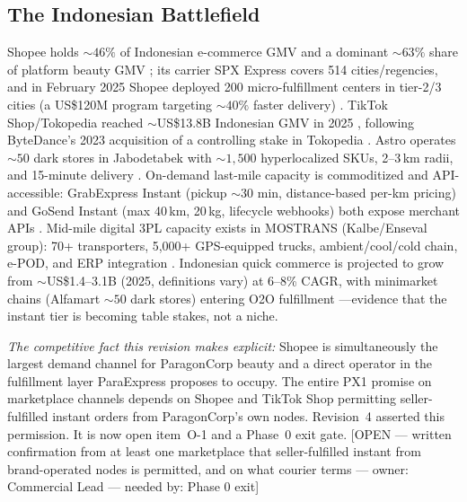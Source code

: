 \documentclass[10pt,twocolumn,letterpaper]{article}
\theoremstyle{definition}
\newcommand{\OPEN}[3]{{\color{openred}\footnotesize\textsf{[OPEN --- #1 --- owner: #2 --- needed by: #3]}}}
\begin{document}
\subsection{The Indonesian Battlefield}
Shopee holds ${\sim}46\%$ of Indonesian e-commerce GMV and a dominant ${\sim}63\%$ share of platform beauty GMV \cite{magpieiq2026,databoks2024}; its carrier SPX Express covers 514 cities/regencies, and in February 2025 Shopee deployed 200 micro-fulfillment centers in tier-2/3 cities (a US\$120M program targeting ${\sim}40\%$ faster delivery) \cite{spx2025,mordor2024}. TikTok Shop/Tokopedia reached ${\sim}$US\$13.8B Indonesian GMV in 2025 \cite{moca2026}, following ByteDance's 2023 acquisition of a controlling stake in Tokopedia \cite{nikkei2023}. Astro operates ${\sim}50$ dark stores in Jabodetabek with ${\sim}1{,}500$ hyperlocalized SKUs, 2--3\,km radii, and 15-minute delivery \cite{theken2023,gpca2024}. On-demand last-mile capacity is commoditized and API-accessible: GrabExpress Instant (pickup ${\sim}30$ min, distance-based per-km pricing) and GoSend Instant (max 40\,km, 20\,kg, lifecycle webhooks) both expose merchant APIs \cite{grab2025,gojek2024}. Mid-mile digital 3PL capacity exists in MOSTRANS (Kalbe/Enseval group): 70+ transporters, 5,000+ GPS-equipped trucks, ambient/cool/cold chain, e-POD, and ERP integration \cite{ssi2022,kalbe2019}. Indonesian quick commerce is projected to grow from ${\sim}$US\$1.4--3.1B (2025, definitions vary) at 6--8\% CAGR, with minimarket chains (Alfamart ${\sim}50$ dark stores) entering O2O fulfillment \cite{rm2026}---evidence that the instant tier is becoming table stakes, not a niche.

\emph{The competitive fact this revision makes explicit:} Shopee is simultaneously the largest demand channel for ParagonCorp beauty and a direct operator in the fulfillment layer ParaExpress proposes to occupy. The entire PX1 promise on marketplace channels depends on Shopee and TikTok Shop permitting seller-fulfilled instant orders from ParagonCorp's own nodes. Revision~4 asserted this permission. It is now open item~O-1 and a Phase~0 exit gate. \OPEN{written confirmation from at least one marketplace that seller-fulfilled instant from brand-operated nodes is permitted, and on what courier terms}{Commercial Lead}{Phase 0 exit}
\end{document}
